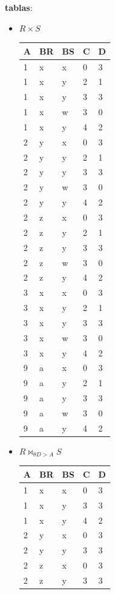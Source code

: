 \documentclass[12pt,a4paper]{article}
\begin{document}
\begin{enumerate}
		\pagebreak
		\textbf{tablas}:
		\begin{itemize}
			\item $R \times S$\\
				\begin{tabular}{|l|l|l|l|l|}
					\hline
					A	&BR	&BS	&C	&D\\
					\hline
					1	&x	&x	&0	&3\\
					1	&x	&y	&2	&1\\
					1	&x	&y	&3	&3\\
					1	&x	&w	&3	&0\\
					1	&x	&y	&4	&2\\
					\hline
					2	&y	&x	&0	&3\\
					2	&y	&y	&2	&1\\
					2	&y	&y	&3	&3\\
					2	&y	&w	&3	&0\\
					2	&y	&y	&4	&2\\
					\hline
					2	&z	&x	&0	&3\\
					2	&z	&y	&2	&1\\
					2	&z	&y	&3	&3\\
					2	&z	&w	&3	&0\\
					2	&z	&y	&4	&2\\
					\hline
					3	&x	&x	&0	&3\\
					3	&x	&y	&2	&1\\
					3	&x	&y	&3	&3\\
					3	&x	&w	&3	&0\\
					3	&x	&y	&4	&2\\
					\hline
					9	&a	&x	&0	&3\\
					9	&a	&y	&2	&1\\
					9	&a	&y	&3	&3\\
					9	&a	&w	&3	&0\\
					9	&a	&y	&4	&2\\
					\hline
				\end{tabular}

			\item $R \bowtie_{\theta D > A} S$\\
				\begin{tabular}{|l|l|l|l|l|}
					\hline
					A	&BR	&BS	&C	&D\\
					\hline
					1	&x	&x	&0	&3\\
					1	&x	&y	&3	&3\\
					1	&x	&y	&4	&2\\
					\hline
					2	&y	&x	&0	&3\\
					2	&y	&y	&3	&3\\
					\hline
					2	&z	&x	&0	&3\\
					2	&z	&y	&3	&3\\
					\hline
				\end{tabular}


\end{itemize}
\end{enumerate}
\end{document}
